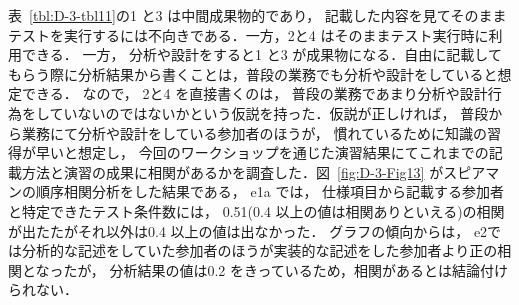 \documentclass[a4paper,11pt]{jreport}
\begin{document}
表~\ref{tbl:D-3-tbl11}の1 と3 は中間成果物的であり， 記載した内容を見てそのままテストを実行するには不向きである．一方，2と4 はそのままテスト実行時に利用できる． 一方， 分析や設計をすると1 と3 が成果物になる．自由に記載してもらう際に分析結果から書くことは，普段の業務でも分析や設計をしていると想定できる． なので， 2と4 を直接書くのは， 普段の業務であまり分析や設計行為をしていないのではないかという仮説を持った．仮説が正しければ， 普段から業務にて分析や設計をしている参加者のほうが， 慣れているために知識の習得が早いと想定し， 今回のワークショップを通じた演習結果にてこれまでの記載方法と演習の成果に相関があるかを調査した．図~\ref{fig:D-3-Fig13} がスピアマンの順序相関分析をした結果である， e1a では， 仕様項目から記載する参加者と特定できたテスト条件数には， 0.51(0.4 以上の値は相関ありといえる)の相関が出たたがそれ以外は0.4 以上の値は出なかった． グラフの傾向からは， e2では分析的な記述をしていた参加者のほうが実装的な記述をした参加者より正の相関となったが， 分析結果の値は0.2 をきっているため，相関があるとは結論付けられない．
\end{document}
